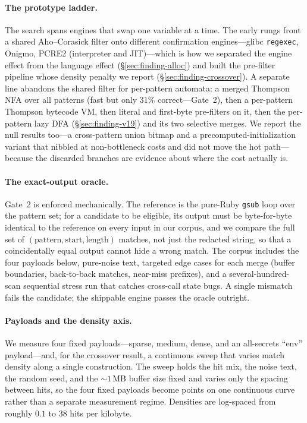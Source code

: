 \documentclass[acmsmall,nonacm,screen]{acmart}
\begin{document}
\paragraph{The prototype ladder.} The search spans engines that swap one variable
at a time. The early rungs front a shared Aho--Corasick filter onto different
confirmation engines---glibc \texttt{regexec}, Onigmo, PCRE2 (interpreter and
JIT)---which is how we separated the engine effect from the language effect
(\S\ref{sec:finding-alloc}) and built the pre-filter pipeline whose density penalty
we report (\S\ref{sec:finding-crossover}). A separate line abandons the shared
filter for per-pattern automata: a merged Thompson NFA over all patterns (fast but
only \(31\%\) correct---Gate~2), then a per-pattern Thompson bytecode VM, then
literal and first-byte pre-filters on it, then the per-pattern lazy DFA
(\S\ref{sec:finding-v19}) and its two selective merges. We report the null results
too---a cross-pattern union bitmap and a precomputed-initialization variant that
nibbled at non-bottleneck costs and did not move the hot path---because the
discarded branches are evidence about where the cost actually is.

\paragraph{The exact-output oracle.} Gate~2 is enforced mechanically. The reference
is the pure-Ruby \texttt{gsub} loop over the pattern set; for a candidate to be
eligible, its output must be byte-for-byte identical to the reference on every input
in our corpus, and we compare the full set of \((\text{pattern}, \text{start},
\text{length})\) matches, not just the redacted string, so that a coincidentally
equal output cannot hide a wrong match. The corpus includes the four payloads
below, pure-noise text, targeted edge cases for each merge (buffer boundaries,
back-to-back matches, near-miss prefixes), and a several-hundred-scan sequential
stress run that catches cross-call state bugs. A single mismatch fails the
candidate; the shippable engine passes the oracle outright.

\paragraph{Payloads and the density axis.} We measure four fixed payloads---sparse,
medium, dense, and an all-secrets ``env'' payload---and, for the crossover result, a
continuous sweep that varies match density along a single construction. The sweep
holds the hit mix, the noise text, the random seed, and the \(\sim\!1\)\,MB buffer
size fixed and varies only the spacing between hits, so the four fixed payloads
become points on one continuous curve rather than a separate measurement regime.
Densities are log-spaced from roughly \(0.1\) to \(38\) hits per kilobyte.
\end{document}
